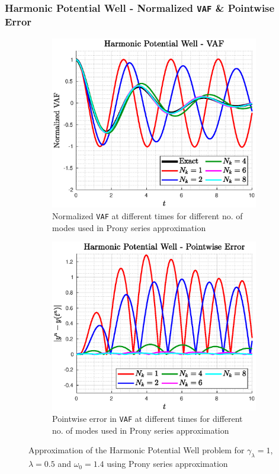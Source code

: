 \documentclass[a4paper,10pt]{beamer}
\begin{document}
	\begin{frame}
		\frametitle{\large Harmonic Potential Well - Normalized \texttt{VAF} \& Pointwise Error}
		\footnotesize
		\begin{figure}[H]
			\centering
			\begin{subfigure}[b]{0.48\linewidth}
				\includegraphics[width=\linewidth]{./Plots/harmonicPotential/solnCompare.eps}
				\caption{\footnotesize Normalized \texttt{VAF} at different times for different no. of modes used in Prony series approximation}
			\end{subfigure}
			\begin{subfigure}[b]{0.48\linewidth}
				\includegraphics[width=\linewidth]{./Plots/harmonicPotential/errorCompare.eps}
				\caption{\footnotesize Pointwise error in \texttt{VAF} at different times for different no. of modes used in Prony series approximation}
			\end{subfigure}
			\caption{Approximation of the Harmonic Potential Well problem for $\gamma_{\lambda} = 1$, $\lambda = 0.5$ and $\omega_{0} = 1.4$ using Prony series approximation}
		\end{figure}
	\end{frame}
\end{document}
